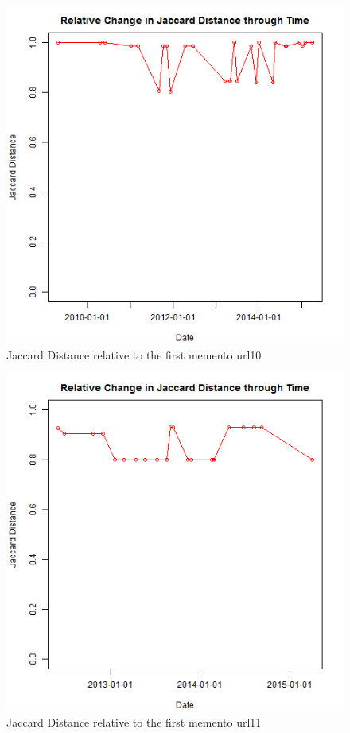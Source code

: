 \begin{figure}[ht]
	\begin{center}
		 \includegraphics[scale=0.60]{url10}
		  \caption{Jaccard Distance relative to the first memento url10}
	 \end{center}
\end{figure}
\begin{figure}[ht]
	\begin{center}
		 \includegraphics[scale=0.60]{url11}
		  \caption{Jaccard Distance relative to the first memento url11}
	 \end{center}
\end{figure}
